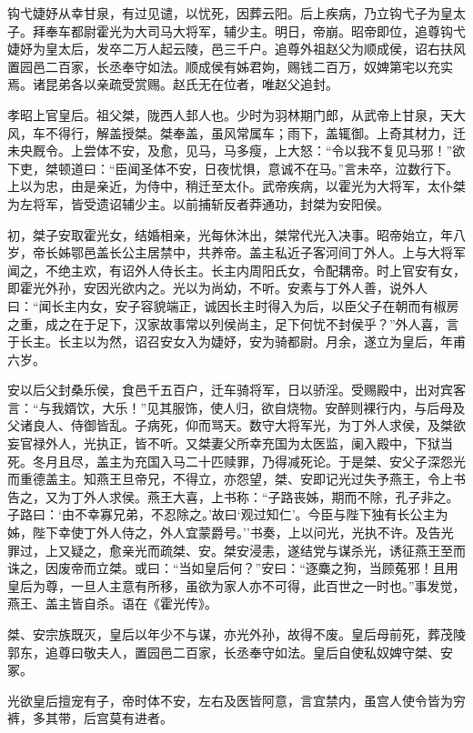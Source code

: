 \documentclass[]{article}
\begin{document}
钩弋婕妤从幸甘泉，有过见谴，以忧死，因葬云阳。后上疾病，乃立钩弋子为皇太子。拜奉车都尉霍光为大司马大将军，辅少主。明日，帝崩。昭帝即位，追尊钩弋婕妤为皇太后，发卒二万人起云陵，邑三千户。追尊外祖赵父为顺成侯，诏右扶风置园邑二百家，长丞奉守如法。顺成侯有姊君姁，赐钱二百万，奴婢第宅以充实焉。诸昆弟各以亲疏受赏赐。赵氏无在位者，唯赵父追封。

孝昭上官皇后。祖父桀，陇西人邽人也。少时为羽林期门郎，从武帝上甘泉，天大风，车不得行，解盖授桀。桀奉盖，虽风常属车；雨下，盖辄御。上奇其材力，迁未央厩令。上尝体不安，及愈，见马，马多瘦，上大怒：``令以我不复见马邪！''欲下吏，桀顿道曰：``臣闻圣体不安，日夜忧惧，意诚不在马。''言未卒，泣数行下。上以为忠，由是亲近，为侍中，稍迁至太仆。武帝疾病，以霍光为大将军，太仆桀为左将军，皆受遗诏辅少主。以前捕斩反者莽通功，封桀为安阳侯。

初，桀子安取霍光女，结婚相亲，光每休沐出，桀常代光入决事。昭帝始立，年八岁，帝长姊鄂邑盖长公主居禁中，共养帝。盖主私近子客河间丁外人。上与大将军闻之，不绝主欢，有诏外人侍长主。长主内周阳氏女，令配耦帝。时上官安有女，即霍光外孙，安因光欲内之。光以为尚幼，不听。安素与丁外人善，说外人曰：``闻长主内女，安子容貌端正，诚因长主时得入为后，以臣父子在朝而有椒房之重，成之在于足下，汉家故事常以列侯尚主，足下何忧不封侯乎？''外人喜，言于长主。长主以为然，诏召安女入为婕妤，安为骑都尉。月余，遂立为皇后，年甫六岁。

安以后父封桑乐侯，食邑千五百户，迁车骑将军，日以骄淫。受赐殿中，出对宾客言：``与我婿饮，大乐！''见其服饰，使人归，欲自烧物。安醉则裸行内，与后母及父诸良人、侍御皆乱。子病死，仰而骂天。数守大将军光，为丁外人求侯，及桀欲妄官禄外人，光执正，皆不听。又桀妻父所幸充国为太医监，阑入殿中，下狱当死。冬月且尽，盖主为充国入马二十匹赎罪，乃得减死论。于是桀、安父子深怨光而重德盖主。知燕王旦帝兄，不得立，亦怨望，桀、安即记光过失予燕王，令上书告之，又为丁外人求侯。燕王大喜，上书称：``子路丧姊，期而不除，孔子非之。子路曰：`由不幸寡兄弟，不忍除之。'故曰`观过知仁'。今臣与陛下独有长公主为姊，陛下幸使丁外人侍之，外人宜蒙爵号。''书奏，上以问光，光执不许。及告光罪过，上又疑之，愈亲光而疏桀、安。桀安浸恚，遂结党与谋杀光，诱征燕王至而诛之，因废帝而立桀。或曰：``当如皇后何？''安曰：``逐麋之狗，当顾菟邪！且用皇后为尊，一旦人主意有所移，虽欲为家人亦不可得，此百世之一时也。''事发觉，燕王、盖主皆自杀。语在《霍光传》。

桀、安宗族既灭，皇后以年少不与谋，亦光外孙，故得不废。皇后母前死，葬茂陵郭东，追尊曰敬夫人，置园邑二百家，长丞奉守如法。皇后自使私奴婢守桀、安冢。

光欲皇后擅宠有子，帝时体不安，左右及医皆阿意，言宜禁内，虽宫人使令皆为穷裤，多其带，后宫莫有进者。
\end{document}
